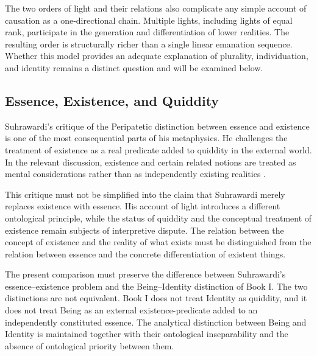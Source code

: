 The two orders of light and their relations
also complicate any simple account of
causation as a one-directional chain.
Multiple lights, including lights of
equal rank, participate in the
generation and differentiation of
lower realities. The resulting order
is structurally richer than a single
linear emanation sequence. Whether
this model provides an adequate
explanation of plurality, individuation,
and identity remains a distinct
question and will be examined below.


\subsection{Essence, Existence, and Quiddity}
\label{sec:ch08-s14-ss11}

\label{para:VS.B01.P01.C08.S14.SS11.P001}

Suhrawardi's critique of the Peripatetic distinction
between essence and existence is one of the
most consequential parts of his metaphysics.
He challenges the treatment of existence as
a real predicate added to quiddity in the
external world. In the relevant discussion,
existence and certain related notions are
treated as mental considerations rather than
as independently existing realities
\citep[Part II, §§56--68]{SuhrawardiPhilosophyIllumination}.

\label{para:VS.B01.P01.C08.S14.SS11.P002}

This critique must not be simplified into the
claim that Suhrawardi merely replaces
existence with essence. His account of
light introduces a different ontological
principle, while the status of quiddity
and the conceptual treatment of existence
remain subjects of interpretive dispute.
The relation between the concept of
existence and the reality of what exists
must be distinguished from the relation
between essence and the concrete
differentiation of existent things.

\label{para:VS.B01.P01.C08.S14.SS11.P003}

The present comparison must preserve the
difference between Suhrawardi's
essence--existence problem and the
Being--Identity distinction of Book I.
The two distinctions are not equivalent.
Book I does not treat Identity as
quiddity, and it does not treat Being
as an external existence-predicate
added to an independently constituted
essence. The analytical distinction
between Being and Identity is maintained
together with their ontological
inseparability and the absence of
ontological priority between them.


